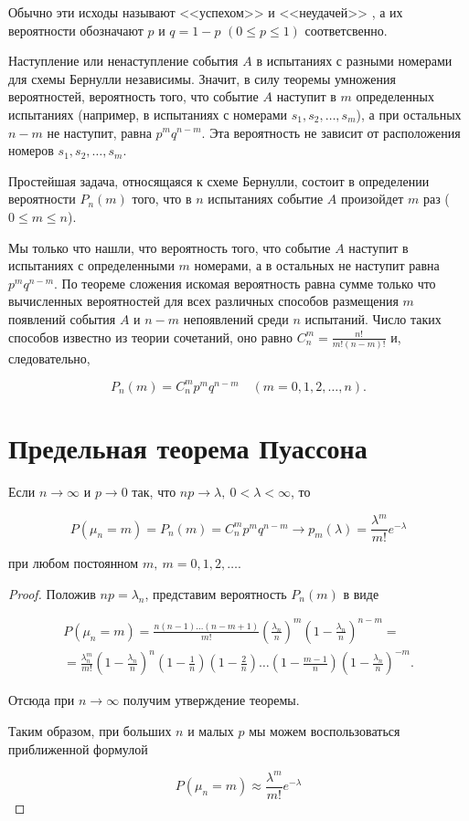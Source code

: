 Обычно эти исходы называют <<успехом>> и <<неудачей>> , а их вероятности обозначают $p$ и $q = 1 - p$ $(0 \le p \le 1)$ соответсвенно.

Наступление или ненаступление события $A$ в испытаниях с разными номерами для схемы Бернулли независимы. Значит, в силу теоремы умножения вероятностей, вероятность того, что событие $A$ наступит в $m$ определенных испытаниях (например, в испытаниях с номерами $s_1, s_2, \ldots, s_m$), а при остальных $n - m$ не наступит, равна $p^mq^{n - m}$. Эта вероятность не зависит от  расположения номеров $s_1, s_2, \ldots, s_m$.

Простейшая задача, относящаяся к схеме Бернулли, состоит в определении вероятности $P_n(m)$ того, что в $n$ испытаниях событие $A$ произойдет $m$ раз ($0 \le m \le n$).

Мы только что нашли, что вероятность того, что событие $A$ наступит в испытаниях с определенными $m$ номерами, а в остальных не наступит равна $p^mq^{n - m}$. По теореме сложения искомая вероятность равна сумме только что вычисленных вероятностей для всех различных способов размещения $m$ появлений события $A$ и $n - m$ непоявлений среди $n$ испытаний. Число таких способов известно из теории сочетаний, оно равно 	$C_n^m = \frac{n!}{m!(n - m)!}$ и, следовательно,
 
\begin{equation} \label{ch32.1.1eq1}
P_n(m) = C_n^m p^mq^{n - m} \quad (m = 0,1,2,\ldots,n).
\end{equation}

\section{Предельная теорема Пуассона}

\begin{thm} 
Если $n \to \infty$ и $p \to 0$ так, что $np \to \lambda, \: 0 < \lambda < \infty$, то

$$
P(\mu_n = m) = P_n(m) = C_n^m p^mq^{n - m} \to p_m(\lambda) = \frac{\lambda^m}{m!} e^{-\lambda}
$$

при любом постоянном $m, \: m = 0,1,2,\ldots$.
\end{thm}

\begin{proof}
Положив $np = \lambda_n$, представим вероятность $P_n(m)$ в виде

\begin{multline*}
P(\mu_n = m) = \frac{n(n - 1)\ldots(n - m + 1)}{m!} \left( \frac{\lambda_n}{n}\right)^m\left( 1 - \frac{\lambda_n}{n}\right)^{n - m} = \\
= \frac{\lambda_n^m}{m!} \left( 1 - \frac{\lambda_n}{n}\right)^n \left( 1 - \frac{1}{n}\right)\left(1 - \frac{2}{n} \right) \ldots \left( 1 - \frac{m - 1}{n}\right)\left(1 - \frac{\lambda_n}{n} \right)^{-m}.
\end{multline*}

Отсюда при $n \to \infty$ получим утверждение теоремы.

Таким образом, при больших $n$ и малых $p$ мы можем воспользоваться приближенной формулой

$$
P(\mu_n = m) \approx \frac{\lambda^m}{m!} e^{-\lambda}
$$
\end{proof}